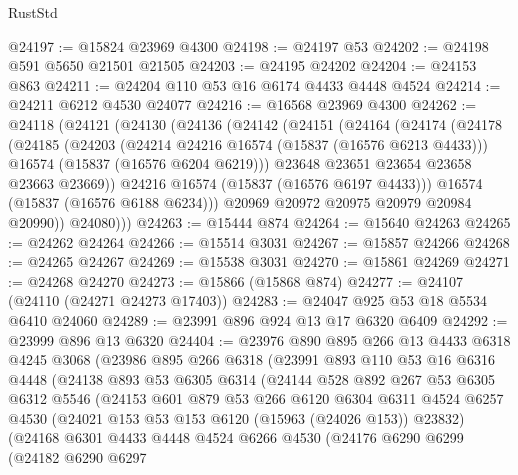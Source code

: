 \begin{lexlean}{RustStd}
\begin{coremodule}
{\begin{coremodule}
{{{{{{{{{{{{{{{{{{{{{{{{{{{{{{{{{{{{{{{{{{{{{{{{{{{{{{{{{{{{@24197 := @15824 @23969 @4300
@24198 := @24197 @53
@24202 := @24198 @591 @5650 @21501 @21505
@24203 := @24195 @24202
@24204 := @24153 @863
@24211 := @24204 @110 @53 @16 @6174 @4433 @4448 @4524
@24214 := @24211 @6212 @4530 @24077
@24216 := @16568 @23969 @4300
@24262 := @24118
    (@24121
      (@24130
        (@24136
          (@24142
            (@24151
              (@24164
                (@24174
                  (@24178
                    (@24185
                      (@24203
                        (@24214 @24216 @16574 (@15837 (@16576 @6213 @4433)))
                        @16574
                        (@15837 (@16576 @6204 @6219)))
                      @23648
                      @23651
                      @23654
                      @23658
                      @23663
                      @23669))
                  @24216
                  @16574
                  (@15837 (@16576 @6197 @4433)))
                @16574
                (@15837 (@16576 @6188 @6234)))
              @20969
              @20972
              @20975
              @20979
              @20984
              @20990))
          @24080)))
@24263 := @15444 @874
@24264 := @15640 @24263
@24265 := @24262 @24264
@24266 := @15514 @3031
@24267 := @15857 @24266
@24268 := @24265 @24267
@24269 := @15538 @3031
@24270 := @15861 @24269
@24271 := @24268 @24270
@24273 := @15866 (@15868 @874)
@24277 := @24107 (@24110 (@24271 @24273 @17403))
@24283 := @24047 @925 @53 @18 @5534 @6410 @24060
@24289 := @23991 @896 @924 @13 @17 @6320 @6409
@24292 := @23999 @896 @13 @6320
@24404 := @23976
    @890
    @895
    @266
    @13
    @4433
    @6318
    @4245
    @3068
    (@23986
      @895
      @266
      @6318
      (@23991
        @893
        @110
        @53
        @16
        @6316
        @4448
        (@24138
          @893
          @53
          @6305
          @6314
          (@24144
            @528
            @892
            @267
            @53
            @6305
            @6312
            @5546
            (@24153
              @601
              @879
              @53
              @266
              @6120
              @6304
              @6311
              @4524
              @6257
              @4530
              (@24021 @153 @53 @153 @6120 (@15963 (@24026 @153)) @23832)
              (@24168
                @6301
                @4433
                @4448
                @4524
                @6266
                @4530
                (@24176
                  @6290
                  @6299
                  (@24182
                    @6290
                    @6297
}}}}}}}}}}}}}}}}}}}}}}}}}}}}}}}}}}}}}}}}}}}}}}}}}}}}}}}}}}}}
\end{coremodule}}
\end{coremodule}
\end{lexlean}
